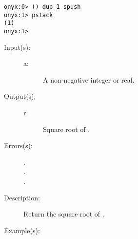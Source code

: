\begin{description}
\begin{description}
\begin{verbatim}
onyx:0> () dup 1 spush
onyx:1> pstack
(1)
onyx:1>
		\end{verbatim}
	\end{description}
\label{systemdict:sqrt}
\item[{\onyxop{a}{sqrt}{r}}: ]
	\begin{description}\item[]
	\item[Input(s): ]
		\begin{description}\item[]
		\item[a: ]
			A non-negative integer or real.
		\end{description}
	\item[Output(s): ]
		\begin{description}\item[]
		\item[r: ]
			Square root of .
		\end{description}
	\item[Errors(s): ]
		\begin{description}\item[]
		\item[.]
		\item[.]
		\item[.]
		\end{description}
	\item[Description: ]
		Return the square root of .
	\item[Example(s): ]\begin{verbatim}


\end{verbatim}
\end{description}
\end{description}
